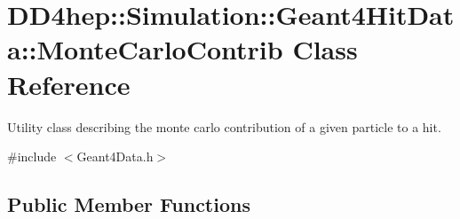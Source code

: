 \hypertarget{class_d_d4hep_1_1_simulation_1_1_geant4_hit_data_1_1_monte_carlo_contrib}{
\section{DD4hep::Simulation::Geant4HitData::MonteCarloContrib Class Reference}
\label{class_d_d4hep_1_1_simulation_1_1_geant4_hit_data_1_1_monte_carlo_contrib}
}


Utility class describing the monte carlo contribution of a given particle to a hit.  


{\ttfamily \#include $<$Geant4Data.h$>$}\subsection*{Public Member Functions}
